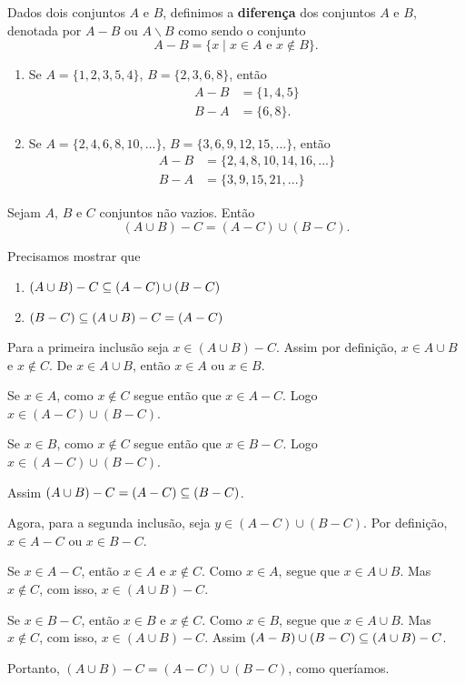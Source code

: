 \begin{definicao}
	Dados dois conjuntos $A$ e $B$, definimos a \textbf{diferen{\c c}a} dos conjuntos $A$ e $B$, denotada por $A-B$ ou $A\backslash B$ como sendo o conjunto
	\[
		A - B = \{x \mid x \in A \mbox{ e } x \notin B\}.
	\]
\end{definicao}

\begin{exemplos}
	\begin{enumerate}[label={\arabic*})]
		\item Se $A=\{1,2,3,5,4\}$, $B=\{2,3,6,8\}$, ent\~ao
		\begin{align*}
			A - B &= \{1,4,5\}\\
			B - A &=\{6,8\}.
		\end{align*}
		\item Se $A=\{2,4,6,8,10,...\}$, $B=\{3,6,9,12,15,...\}$, ent\~ao
		\begin{align*}
		 	A - B &= \{2,4,8,10,14,16,...\}\\
		 	B - A &= \{3,9,15,21,...\}
		 \end{align*}
	\end{enumerate}
	
\end{exemplos}

\begin{proposicao}
	Sejam $A$, $B$ e $C$ conjuntos n\~ao vazios. Ent\~ao
	\[(A \cup B) - C = (A - C) \cup (B - C).\]
\end{proposicao}
\begin{prova}
	Precisamos mostrar que
	\begin{enumerate}
		\item $(A \cup B) - C \subseteq (A - C) \cup (B - C)$
		\item $(B - C) \subseteq (A \cup B) - C = (A - C)$
	\end{enumerate}
	Para a primeira inclusão seja $x \in (A \cup B) - C$. Assim por definição, $x \in A \cup B$ e $x \notin C$. De $x \in A \cup B$, então $x \in A$ ou $x \in B$.
	
	Se $x \in A$, como $x \notin C$ segue então que $x \in A - C$. Logo $x \in (A - C) \cup (B - C)$.

	Se $x \in B$, como $x \notin C$ segue então que $x \in B - C$. Logo $x \in (A - C) \cup (B - C)$.

	Assim $(A \cup B) - C = (A - C) \subseteq (B - C)$.

	Agora, para a segunda inclusão, seja $y \in (A - C) \cup (B - C)$. Por definição, $x \in A - C$ ou $x \in B - C$.

	Se $x \in A - C$, então $x \in A$ e $x \notin C$. Como $x \in A$, segue que $x \in A \cup B$. Mas $x \notin C$, com isso, $x \in (A \cup B) - C$.

	Se $x \in B - C$, então $x \in B$ e $x \notin C$. Como $x \in B$, segue que $x \in A \cup B$. Mas $x \notin C$, com isso, $x \in (A \cup B) - C$.
	Assim $(A - B) \cup (B - C) \subseteq (A \cup B) - C$.

	Portanto, $(A \cup B) - C = (A - C) \cup (B - C)$, como queríamos.
\end{prova}

